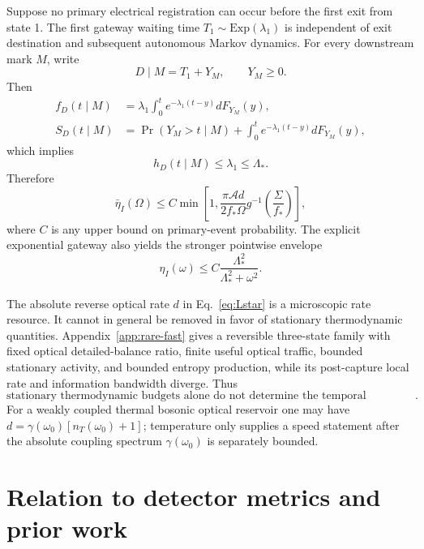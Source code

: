 \documentclass[aps,prapplied,preprint,nofootinbib]{revtex4-2}
\begin{document}
Suppose no primary electrical registration can occur before the first exit from state 1. The first gateway waiting time $T_1\sim\mathrm{Exp}(\lambda_1)$ is independent of exit destination and subsequent autonomous Markov dynamics. For every downstream mark $M$, write
\begin{equation}
D\mid M=T_1+Y_M,
\qquad Y_M\ge0.
\end{equation}
Then
\begin{align}
f_D(t\mid M)&=\lambda_1\int_0^t e^{-\lambda_1(t-y)}dF_{Y_M}(y),\\
S_D(t\mid M)&=\Pr(Y_M>t\mid M)+\int_0^t e^{-\lambda_1(t-y)}dF_{Y_M}(y),
\end{align}
which implies
\begin{equation}
\boxed{h_D(t\mid M)\le\lambda_1\le\Lambda_*.}
\label{eq:bridge}
\end{equation}
Therefore
\begin{equation}
\boxed{
\bar\eta_I(\Omega)
\le C\min\left[
1,
\frac{\pi\mathcal A d}{2f_*\Omega}
 g^{-1}\!\left(\frac{\Sigma}{f_*}\right)
\right],}
\label{eq:thermo}
\end{equation}
where $C$ is any upper bound on primary-event probability. The explicit exponential gateway also yields the stronger pointwise envelope
\begin{equation}
\eta_I(\omega)\le
C\frac{\Lambda_*^2}{\Lambda_*^2+\omega^2}.
\end{equation}

The absolute reverse optical rate $d$ in Eq.~\eqref{eq:Lstar} is a microscopic rate resource. It cannot in general be removed in favor of stationary thermodynamic quantities. Appendix~\ref{app:rare-fast} gives a reversible three-state family with fixed optical detailed-balance ratio, finite useful optical traffic, bounded stationary activity, and bounded entropy production, while its post-capture local rate and information bandwidth diverge. Thus
\begin{equation}
\boxed{
\text{stationary thermodynamic budgets alone do not determine the temporal information scale}.}
\end{equation}
For a weakly coupled thermal bosonic optical reservoir one may have $d=\gamma(\omega_0)[n_T(\omega_0)+1]$; temperature only supplies a speed statement after the absolute coupling spectrum $\gamma(\omega_0)$ is separately bounded.

\section{Relation to detector metrics and prior work}
\end{document}
